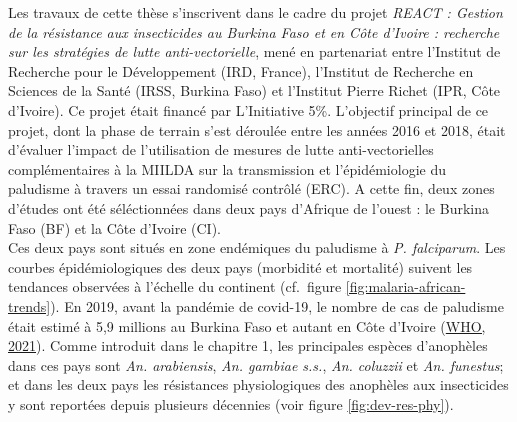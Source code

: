 \documentclass[12pt,twoside]{reedthesis}
\begin{document}
Les travaux de cette thèse s'inscrivent dans le cadre du projet \emph{REACT : Gestion de la résistance aux insecticides au Burkina Faso et en Côte d'Ivoire : recherche sur les stratégies de lutte anti-vectorielle}, mené en partenariat entre l'Institut de Recherche pour le Développement (IRD, France), l'Institut de Recherche en Sciences de la Santé (IRSS, Burkina Faso) et l'Institut Pierre Richet (IPR, Côte d'Ivoire). Ce projet était financé par L'Initiative 5\%. L'objectif principal de ce projet, dont la phase de terrain s'est déroulée entre les années 2016 et 2018, était d'évaluer l'impact de l'utilisation de mesures de lutte anti-vectorielles complémentaires à la MIILDA sur la transmission et l'épidémiologie du paludisme à travers un essai randomisé contrôlé (ERC). A cette fin, deux zones d'études ont été séléctionnées dans deux pays d'Afrique de l'ouest : le Burkina Faso (BF) et la Côte d'Ivoire (CI).\\

Ces deux pays sont situés en zone endémiques du paludisme à \emph{P. falciparum}. Les courbes épidémiologiques des deux pays (morbidité et mortalité) suivent les tendances observées à l'échelle du continent (cf.~figure \ref{fig:malaria-african-trends}). En 2019, avant la pandémie de covid-19, le nombre de cas de paludisme était estimé à 5,9 millions au Burkina Faso et autant en Côte d'Ivoire (\protect\hyperlink{ref-who_2021}{WHO, 2021}). Comme introduit dans le chapitre 1, les principales espèces d'anophèles dans ces pays sont \emph{An. arabiensis}, \emph{An. gambiae s.s.}, \emph{An. coluzzii} et \emph{An. funestus}; et dans les deux pays les résistances physiologiques des anophèles aux insecticides y sont reportées depuis plusieurs décennies (voir figure \ref{fig:dev-res-phy}).\\
\end{document}
